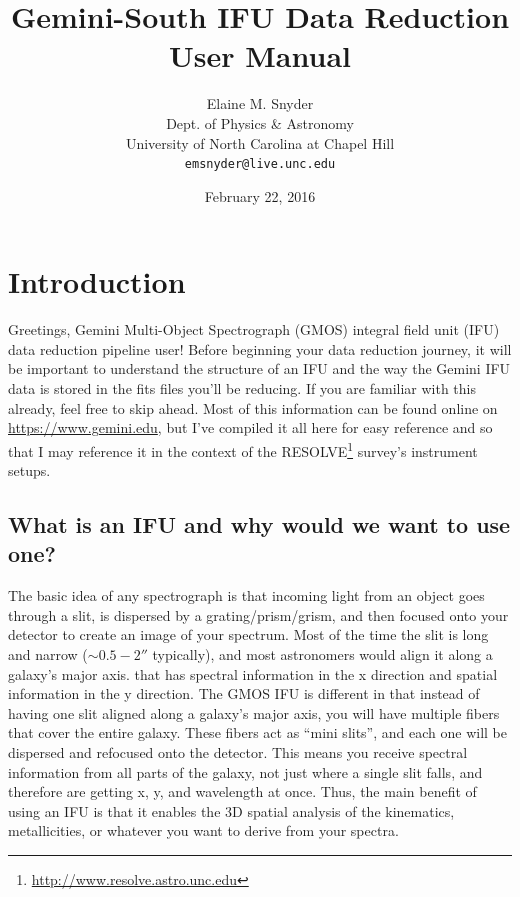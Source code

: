 \documentclass[12pt]{report}
\begin{document}
\title{Gemini-South IFU Data Reduction User Manual}
\author{Elaine M. Snyder\\
Dept. of Physics \& Astronomy\\
University of North Carolina at Chapel Hill \\
\texttt{emsnyder@live.unc.edu}}
\date{February 22, 2016}
\maketitle

\hypersetup{linkcolor=magenta}
\tableofcontents
\listoftables
\listoffigures


\chapter{Introduction}
Greetings, Gemini Multi-Object Spectrograph (GMOS) integral field unit (IFU) data reduction pipeline user! Before beginning your data reduction journey, it will be important to understand the structure of an IFU and the way the Gemini IFU data is stored in the fits files you'll be reducing. If you are familiar with this already, feel free to skip ahead. Most of this information can be found online on \url{https://www.gemini.edu}, but I've compiled it all here for easy reference and so that I may reference it in the context of the RESOLVE\footnote{\url{http://www.resolve.astro.unc.edu}} survey's instrument setups.

\section{What is an IFU and why would we want to use one?}

The basic idea of any spectrograph is that incoming light from an object goes through a slit, is dispersed by a grating/prism/grism, and then focused onto your detector to create an image of your spectrum. Most of the time the slit is long and narrow ($\sim0.5-2''$ typically), and most astronomers would align it along a galaxy's major axis. that has spectral information in the x direction and spatial information in the y direction. The GMOS IFU is different in that instead of having one slit aligned along a galaxy's major axis, you will have multiple fibers that cover the entire galaxy. These fibers act as ``mini slits'', and each one will be dispersed and refocused onto the detector. This means you receive spectral information from all parts of the galaxy, not just where a single slit falls, and therefore are getting x, y, and wavelength at once. Thus, the main benefit of using an IFU is that it enables the 3D spatial analysis of the kinematics, metallicities, or whatever you want to derive from your spectra.
\end{document}
